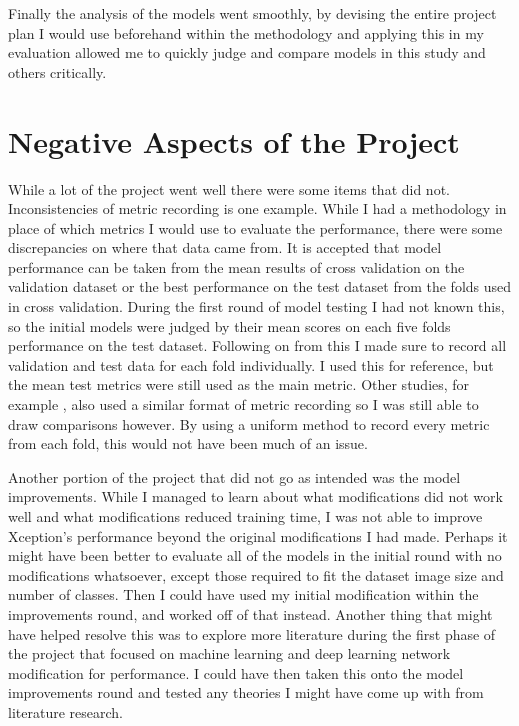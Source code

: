 Finally the analysis of the models went smoothly, by devising the entire project plan I would use beforehand within the methodology and applying this in my evaluation allowed me to quickly judge and compare models in this study and others critically. 

\section{Negative Aspects of the Project}
While a lot of the project went well there were some items that did not. Inconsistencies of metric recording is one example. While I had a methodology in place of which metrics I would use to evaluate the performance, there were some discrepancies on where that data came from. It is accepted that model performance can be taken from the mean results of cross validation on the validation dataset or the best performance on the test dataset from the folds used in cross validation. During the first round of model testing I had not known this, so the initial models were judged by their mean scores on each five folds performance on the test dataset. Following on from this I made sure to record all validation and test data for each fold individually. I used this for reference, but the mean test metrics were still used as the main metric. Other studies, for example \cite{bressem2020comparing}, also used a similar format of metric recording so I was still able to draw comparisons however. By using a uniform method to record every metric from each fold, this would not have been much of an issue.

Another portion of the project that did not go as intended was the model improvements. While I managed to learn about what modifications did not work well and what modifications reduced training time, I was not able to improve Xception's performance beyond the original modifications I had made. Perhaps it might have been better to evaluate all of the models in the initial round with no modifications whatsoever, except those required to fit the dataset image size and number of classes. Then I could have used my initial modification within the improvements round, and worked off of that instead. Another thing that might have helped resolve this was to explore more literature during the first phase of the project that focused on machine learning and deep learning network modification for performance. I could have then taken this onto the model improvements round and tested any theories I might have come up with from literature research.

